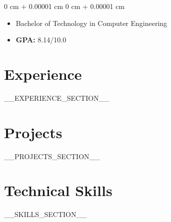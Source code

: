 \documentclass[10pt, letterpaper]{article}
\newenvironment{highlights}{
    \begin{itemize}[
        topsep=0.10 cm,
        parsep=0.10 cm,
        partopsep=0pt,
        itemsep=0pt,
        leftmargin=0 cm + 10pt
    ]
}{
    \end{itemize}
} %
\newenvironment{onecolentry}{
    \begin{adjustwidth}{
        0 cm + 0.00001 cm
    }{
        0 cm + 0.00001 cm
    }
}{
    \end{adjustwidth}
} %
\begin{document}
        \vspace{0.10 cm}
        \begin{onecolentry}
            \begin{highlights}
                \item Bachelor of Technology in Computer Engineering
                \item \textbf{GPA:} 8.14/10.0
            \end{highlights}
        \end{onecolentry}



\section{Experience}
__EXPERIENCE_SECTION__

\section{Projects}
__PROJECTS_SECTION__

\section{Technical Skills}
__SKILLS_SECTION__
\end{document}
